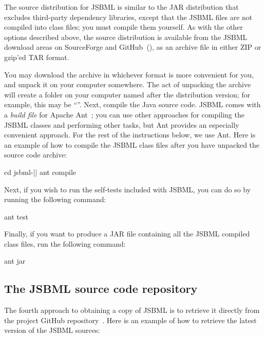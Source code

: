 The source distribution for JSBML is similar to the JAR distribution that
excludes third-party dependency libraries, except that the JSBML files are
not compiled into class files; you must compile them yourself. As with the
other options described above, the source distribution is available from
the JSBML download areas on SourceForge and
GitHub~(\cite{JSBMLdownloadSF, JSBMLdownloadGitHub}), as an archive file in
either ZIP or gzip'ed TAR format.

You may download the archive in whichever format is more convenient for
you, and unpack it
on your computer somewhere.  The act of unpacking the archive will create a
folder on your computer named after the distribution version; for
example, this may be ``\jsbmlversion''.  Next, compile
the Java source code.  JSBML comes with a \emph{build file} for Apache Ant~\citep{ApacheAnt};
you can use other approaches for compiling the JSBML classes and
performing other tasks, but Ant provides an especially convenient approach.
For the rest of the instructions below, we use Ant.  Here is an example of
how to compile the JSBML class files after you have unpacked the source
code archive:

\begin{example}[style=bash, title={Compiling JSBML with Ant; this example
    uses Bash shell syntax.}] 
cd jsbml-|\jsbmlversion|
ant compile
\end{example}

Next, if you wish to run the self-tests included with JSBML, you can do so by
running the following command:

\begin{example}[style=bash, title={Running the unit tests provided with JSBML.}]
ant test
\end{example}

Finally, if you want to produce a JAR file containing all the JSBML
compiled class files, run the following command:

\begin{example}[style=bash, title={Creating a JAR file.}]
ant jar
\end{example}



\subsection{The JSBML source code repository}
\label{sec:SourceDistribution}

The fourth approach to obtaining a copy of JSBML is to retrieve it directly
from the project GitHub repository~\citep{JSBMLGIT}.  Here is an example of how
to retrieve the latest version of the JSBML sources:

